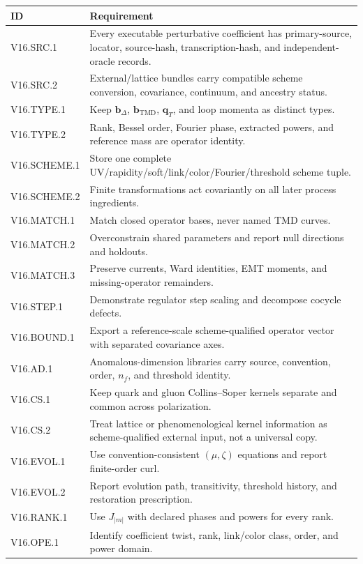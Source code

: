 \documentclass[11pt]{article}
\newcommand{\bD}{\bm b_{\Delta}}
\newcommand{\bM}{\bm b_{\mathrm{TMD}}}
\newcommand{\qT}{\bm q_T}
\begin{document}
\footnotesize
\begin{longtable}{L{0.17\textwidth}L{0.75\textwidth}}
\toprule
ID & Requirement\\
\midrule
\endhead
V16.SRC.1 & Every executable perturbative coefficient has primary-source, locator, source-hash, transcription-hash, and independent-oracle records.\\
V16.SRC.2 & External/lattice bundles carry compatible scheme conversion, covariance, continuum, and ancestry status.\\
V16.TYPE.1 & Keep \(\bD\), \(\bM\), \(\qT\), and loop momenta as distinct types.\\
V16.TYPE.2 & Rank, Bessel order, Fourier phase, extracted powers, and reference mass are operator identity.\\
V16.SCHEME.1 & Store one complete UV/rapidity/soft/link/color/Fourier/threshold scheme tuple.\\
V16.SCHEME.2 & Finite transformations act covariantly on all later process ingredients.\\
V16.MATCH.1 & Match closed operator bases, never named TMD curves.\\
V16.MATCH.2 & Overconstrain shared parameters and report null directions and holdouts.\\
V16.MATCH.3 & Preserve currents, Ward identities, EMT moments, and missing-operator remainders.\\
V16.STEP.1 & Demonstrate regulator step scaling and decompose cocycle defects.\\
V16.BOUND.1 & Export a reference-scale scheme-qualified operator vector with separated covariance axes.\\
V16.AD.1 & Anomalous-dimension libraries carry source, convention, order, \(n_f\), and threshold identity.\\
V16.CS.1 & Keep quark and gluon Collins--Soper kernels separate and common across polarization.\\
V16.CS.2 & Treat lattice or phenomenological kernel information as scheme-qualified external input, not a universal copy.\\
V16.EVOL.1 & Use convention-consistent \((\mu,\zeta)\) equations and report finite-order curl.\\
V16.EVOL.2 & Report evolution path, transitivity, threshold history, and restoration prescription.\\
V16.RANK.1 & Use \(J_{|m|}\) with declared phases and powers for every rank.\\
V16.OPE.1 & Identify coefficient twist, rank, link/color class, order, and power domain.\\

\end{longtable}
\end{document}
